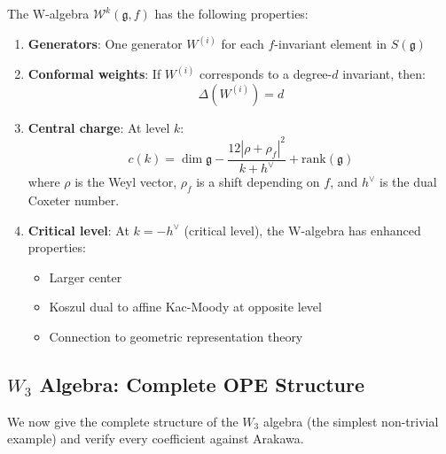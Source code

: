 \begin{theorem}
\label{thm:w-algebra-structure-arakawa-detailed}
The W-algebra $\mathcal{W}^k(\mathfrak{g}, f)$ has the following properties:
\begin{enumerate}
\item \textbf{Generators}: One generator $W^{(i)}$ for each $f$-invariant element in 
$S(\mathfrak{g})$

\item \textbf{Conformal weights}: If $W^{(i)}$ corresponds to a degree-$d$ invariant, 
then:
\begin{equation}
\Delta(W^{(i)}) = d
\end{equation}

\item \textbf{Central charge}: At level $k$:
\begin{equation}
c(k) = \dim \mathfrak{g} - \frac{12 |\rho + \rho_f|^2}{k + h^\vee} + \text{rank}(
\mathfrak{g})
\end{equation}
where $\rho$ is the Weyl vector, $\rho_f$ is a shift depending on $f$, and $h^\vee$ is 
the dual Coxeter number.

\item \textbf{Critical level}: At $k = -h^\vee$ (critical level), the W-algebra has 
enhanced properties:
\begin{itemize}
\item Larger center
\item Koszul dual to affine Kac-Moody at opposite level
\item Connection to geometric representation theory
\end{itemize}
\end{enumerate}
\end{theorem}

\subsection{$W_3$ Algebra: Complete OPE Structure}
\label{sec:w3-algebra-complete-opes}

We now give the complete structure of the $W_3$ algebra (the simplest non-trivial example) 
and verify every coefficient against Arakawa.

